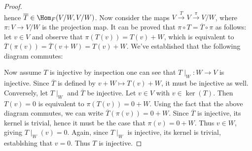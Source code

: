 \documentclass[10pt,twoside,openany]{memoir}
\theoremstyle{plain}
\theoremstyle{definition}
\theoremstyle{remark}
\numberwithin{equation}{section}
\begin{document}
\begin{proof}
\begin{equation*}
                \end{equation*}
            hence $\overline{T} \in \Hom_F{(V/W, V/W)}$. Now consider the maps $V \xrightarrow{T} V \xrightarrow{\pi} V/W$, where $\pi:V \rightarrow V/W$ is the projection map. It can be proved that $\pi \circ T = \overline{T} \circ \pi$ as follows: let $v \in V$ and observe that $\pi(T(v)) = T(v) + W$, which is equivalent to $\overline{T}(\pi(v)) = \overline{T}(v + W) = T(v) + W$. We've established that the following diagram commutes:
            \begin{center}
            \end{center}

            
            Now assume $T$ is injective \textemdash by inspection one can see that $T\mid_W : W \rightarrow V$ is injective. Since $\overline{T}$ is defined by $v + W \mapsto T(v)+W$, it must be injective as well. Conversely, let $T\mid_W$ and $\overline{T}$ be injective. Let $v \in V$ with $v \in \ker{(T)}$. Then $T(v) = 0$ is equivalent to $\pi(T(v)) = 0 + W$. Using the fact that the above diagram commutes, we can write $\overline{T}(\pi(v)) = 0 + W$. Since $\overline{T}$ is injective, its kernel is trivial, hence it must be the case that $\pi(v) = 0 +W$. Thus $v \in W$, giving $T\mid_W (v) = 0$. Again, since $T\mid_W$ is injective, its kernel is trivial, establshing that $v= 0$. Thus $T$ is injective.
        \end{proof}
\end{document}
